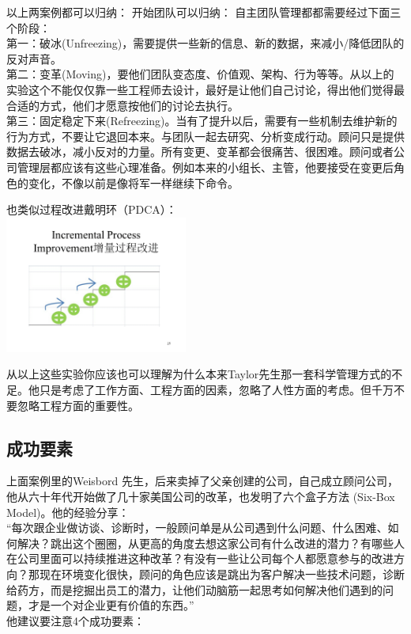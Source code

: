 以上两案例都可以归纳： 开始团队可以归纳：
自主团队管理都都需要经过下面三个阶段：\\
第一：破冰(Unfreezing)，需要提供一些新的信息、新的数据，来减小/降低团队的反对声音。\\
第二：变革(Moving)，要他们团队变态度、价值观、架构、行为等等。从以上的实验这个不能仅仅靠一些工程师去设计，最好是让他们自己讨论，得出他们觉得最合适的方式，他们才愿意按他们的讨论去执行。\\
第三：固定稳定下来(Refreezing)。当有了提升以后，需要有一些机制去维护新的行为方式，不要让它退回本来。与团队一起去研究、分析变成行动。顾问只是提供数据去破冰，减小反对的力量。所有变更、变革都会很痛苦、很困难。顾问或者公司管理层都应该有这些心理准备。例如本来的小组长、主管，他要接受在变更后角色的变化，不像以前是像将军一样继续下命令。

也类似过程改进戴明环（PDCA）：\\

\includegraphics[width=6cm]{IPM.png}

从以上这些实验你应该也可以理解为什么本来Taylor先生那一套科学管理方式的不足。他只是考虑了工作方面、工程方面的因素，忽略了人性方面的考虑。但千万不要忽略工程方面的重要性。

\hypertarget{ux6210ux529fux8981ux7d20}{%
\subsection{成功要素}\label{ux6210ux529fux8981ux7d20}}

上面案例里的Weisbord
先生，后来卖掉了父亲创建的公司，自己成立顾问公司，他从六十年代开始做了几十家美国公司的改革，也发明了六个盒子方法
(Six-Box Model)。他的经验分享：\\
``每次跟企业做访谈、诊断时，一般顾问单是从公司遇到什么问题、什么困难、如何解决？跳出这个圈圈，从更高的角度去想这家公司有什么改进的潜力？有哪些人在公司里面可以持续推进这种改革？有没有一些让公司每个人都愿意参与的改进方向？那现在环境变化很快，顾问的角色应该是跳出为客户解决一些技术问题，诊断给药方，而是挖掘出员工的潜力，让他们动脑筋一起思考如何解决他们遇到的问题，才是一个对企业更有价值的东西。''\\
他建议要注意4个成功要素：

